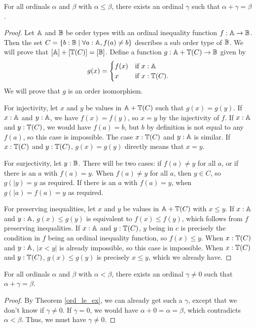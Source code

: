 \documentclass[../../math.tex]{subfiles}
\begin{document}
\begin{theorem} \label{ord_le_ex}
    For all ordinals $\alpha$ and $\beta$ with $\alpha \leq \beta$, there exists
    an ordinal $\gamma$ such that $\alpha + \gamma = \beta$.
\end{theorem}
\begin{proof}
    Let $\mathbb{A}$ and $\mathbb{B}$ be order types with an ordinal inequality function $f : \mathbb{A}
    \to \mathbb{B}$.  Then the set $C = \{b : \mathbb{B} \mid \forall a : \mathbb{A}, f(a) \neq b\}$
    describes a sub order type of $\mathbb{B}$.  We will prove that $[\mathbb{A}] + [\mathbb{T}(C)] =
    [\mathbb{B}]$.  Define a function $g : \mathbb{A} + \mathbb{T}(C) \to \mathbb{B}$ given by
    \[
        g(x) =
        \begin{cases}
            f(x) &\text{if $x : \mathbb{A}$} \\
            x    &\text{if $x : \mathbb{T}(C)$.}
        \end{cases}
    \]
    We will prove that $g$ is an order isomorphism.

    For injectivity, let $x$ and $y$ be values in $\mathbb{A} + \mathbb{T}(C)$ such that $g(x) =
    g(y)$.  If $x : \mathbb{A}$ and $y : \mathbb{A}$, we have $f(x) = f(y)$, so $x = y$ by the
    injectivity of $f$.  If $x : \mathbb{A}$ and $y : \mathbb{T}(C)$, we would have $f(a) = b$,
    but $b$ by definition is not equal to any $f(a)$, so this case is
    impossible.  The case $x : \mathbb{T}(C)$ and $y : \mathbb{A}$ is similar.  If $x : \mathbb{T}(C)$
    and $y : \mathbb{T}(C)$, $g(x) = g(y)$ directly means that $x = y$.

    For surjectivity, let $y : \mathbb{B}$.  There will be two cases: if $f(a) \neq y$
    for all $a$, or if there is an $a$ with $f(a) = y$.  When $f(a) \neq y$ for
    all $a$, then $y \in C$, so $g(|y) = y$ as required.  If there is an $a$ with
    $f(a) = y$, when $g(|a) = f(a) = y$ as required.

    For preserving inequalities, let $x$ and $y$ be values in $\mathbb{A} + \mathbb{T}(C)$ with
    $x \leq y$.  If $x : \mathbb{A}$ and $y : \mathbb{A}$, $g(x) \leq g(y)$ is equivalent to
    $f(x) \leq f(y)$, which follows from $f$ preserving inequalities.  If $x :
    \mathbb{A}$ and $y : \mathbb{T}(C)$, $y$ being in $c$ is precisely the condition in $f$
    being an ordinal inequality function, so $f(x) \leq y$.  When $x : \mathbb{T}(C)$
    and $y : \mathbb{A}$, $|x < y|$ is already impossible, so this case is impossible.
    When $x : \mathbb{T}(C)$ and $y : \mathbb{T}(C)$, $g(x) \leq g(y)$ is precisely $x \leq y$,
    which we already have.
\end{proof}

\begin{theorem} \label{ord_lt_ex}
    For all ordinals $\alpha$ and $\beta$ with $\alpha < \beta$, there exists
    an ordinal $\gamma \neq 0$ such that $\alpha + \gamma = \beta$.
\end{theorem}
\begin{proof}
    By Theorem \ref{ord_le_ex}, we can already get such a $\gamma$, except that
    we don't know if $\gamma \neq 0$.  If $\gamma = 0$, we would have $\alpha +
    0 = \alpha = \beta$, which contradicts $\alpha < \beta$.  Thus, we must have
    $\gamma \neq 0$.
\end{proof}
\end{document}
